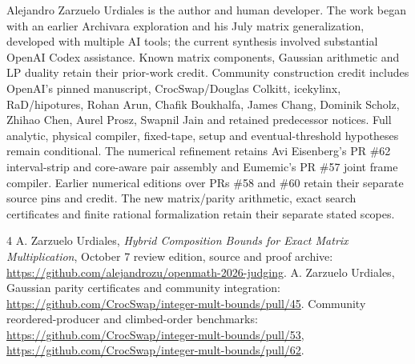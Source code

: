 \documentclass[11pt]{article}
\begin{document}
Alejandro Zarzuelo Urdiales is the author and human developer. The work
began with an earlier Archivara exploration and his July matrix
generalization, developed with multiple AI tools; the current synthesis
involved substantial OpenAI Codex assistance. Known matrix components,
Gaussian arithmetic and LP duality retain their prior-work credit.
Community construction credit includes OpenAI's pinned manuscript,
CrocSwap/Douglas Colkitt, icekylinx, RaD/hipotures, Rohan Arun, Chafik
Boukhalfa, James Chang, Dominik Scholz, Zhihao Chen, Aurel Prosz, Swapnil
Jain and retained predecessor notices. Full analytic, physical compiler,
fixed-tape, setup and eventual-threshold hypotheses remain conditional.
The numerical refinement retains Avi Eisenberg's PR \#62 interval-strip and core-aware pair
assembly and Eumemic's PR \#57 joint frame compiler. Earlier numerical
editions over PRs \#58 and \#60 retain their separate source pins and credit. The new matrix/parity arithmetic,
exact search certificates and finite rational formalization retain their
separate stated scopes.

\begin{thebibliography}{4}
 A. Zarzuelo Urdiales, \emph{Hybrid Composition Bounds for
Exact Matrix Multiplication}, October 7 review edition, source and proof
archive: \url{https://github.com/alejandrozu/openmath-2026-judging}.
 A. Zarzuelo Urdiales, Gaussian parity certificates and
community integration: \url{https://github.com/CrocSwap/integer-mult-bounds/pull/45}.
 Community reordered-producer and climbed-order
benchmarks: \url{https://github.com/CrocSwap/integer-mult-bounds/pull/53},
\url{https://github.com/CrocSwap/integer-mult-bounds/pull/62}.
\end{thebibliography}
\end{document}
